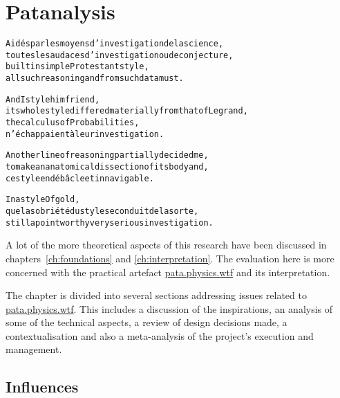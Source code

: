 
\chapter{Patanalysis}
\label{ch:analysis}

\startcontents[chapters]

\vfill

\begin{alltt}\sffamily
Aidés par les moyens d'investigation de la science,
toutes les audaces d'investigation ou de conjecture,
built in simple Protestant style,
all such reasoning and from such data must.

And I style him friend,
its whole style differed materially from that of Legrand,
the calculus of Probabilities,
n'échappaient à leur investigation.

Another line of reasoning partially decided me,
to make an anatomical dissection of its body and,
ce style en débâcle et innavigable.

In a style Of gold,
que la sobriété du style se conduit de la sorte,
still a point worthy very serious investigation.
\end{alltt}

\newpage
\minicontents
\spirals


\spirals

A lot of the more theoretical aspects of this research have been discussed in chapters~\ref{ch:foundations} and \ref{ch:interpretation}. The evaluation here is more concerned with the practical artefact \url{pata.physics.wtf} and its interpretation.

The chapter is divided into several sections addressing issues related to \url{pata.physics.wtf}. This includes a discussion of the inspirations, an analysis of some of the technical aspects, a review of design decisions made, a contextualisation and also a meta-analysis of the project's execution and management.


\section{Influences}

